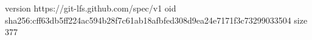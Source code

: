 version https://git-lfs.github.com/spec/v1
oid sha256:cff63db5ff224ac594b28f7c61ab18afbfed308d9ea24e7171f3c73299033504
size 377
